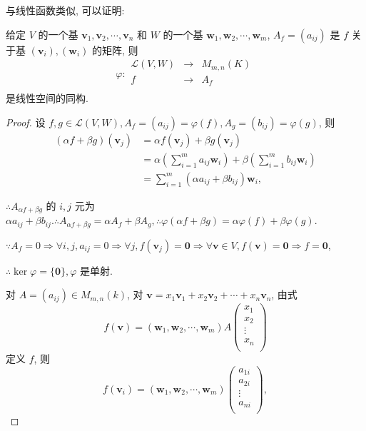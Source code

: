 \documentclass[color=black,device=normal,lang=cn,mode=geye]{elegantnote}
\begin{document}
与线性函数类似, 可以证明:
\begin{theorem}[书上的定理 2(i)]\label{t1.2}
    给定 $V$ 的一个基 $\boldsymbol{v}_1,\boldsymbol{v}_2,\cdots,\boldsymbol{v}_n$ 和 $W$ 的一个基 $\boldsymbol{w}_1,\boldsymbol{w}_2,\cdots,\boldsymbol{w}_m$, $A_f=(a_{ij})$ 是 $f$ 关于基 $(\boldsymbol{v}_i),(\boldsymbol{w}_i)$ 的矩阵, 则
    \[\varphi:\begin{array}{rcl}
        \mathcal{L}(V,W) & \to & M_{m,n}(K) \\
        f & \to & A_f \\
    \end{array}\]
    是线性空间的同构.
\end{theorem}
\begin{proof}
    设 $f,g\in\mathcal{L}(V,W),A_f=(a_{ij})=\varphi(f),A_g=(b_{ij})=\varphi(g)$, 则
    \begin{align*}
        (\alpha f+\beta g)(\boldsymbol{v}_j) & =\alpha f(\boldsymbol{v}_j)+\beta g(\boldsymbol{v}_j) \\
        & =\alpha\left(\sum\limits_{i=1}^ma_{ij}\boldsymbol{w}_i\right)+\beta\left(\sum\limits_{i=1}^mb_{ij}\boldsymbol{w}_i\right) \\
        & =\sum\limits_{i=1}^m(\alpha a_{ij}+\beta b_{ij})\boldsymbol{w}_i,
    \end{align*}
    
    $\therefore A_{\alpha f+\beta g}$ 的 $i,j$ 元为 $\alpha a_{ij}+\beta b_{ij}.\therefore A_{\alpha f+\beta g}=\alpha A_f+\beta A_g,\therefore\varphi(\alpha f+\beta g)=\alpha\varphi(f)+\beta\varphi(g)$.

    $\because A_f=0\Rightarrow\forall i,j,a_{ij}=0\Rightarrow\forall j,f(\boldsymbol{v}_j)=\boldsymbol{0}\Rightarrow\forall\boldsymbol{v}\in V,f(\boldsymbol{v})=\boldsymbol{0}\Rightarrow f=\boldsymbol{0}$,

    $\therefore\ker\varphi=\{\boldsymbol{0}\},\varphi$ 是单射.

    对 $A=(a_{ij})\in M_{m,n}(k)$, 对 $\boldsymbol{v}=x_1\boldsymbol{v}_1+x_2\boldsymbol{v}_2+\cdots+x_n\boldsymbol{v}_n$, 由式
    \[f(\boldsymbol{v})=(\boldsymbol{w}_1,\boldsymbol{w}_2,\cdots,\boldsymbol{w}_m)A\begin{pmatrix}
        x_1 \\
        x_2 \\
        \vdots \\
        x_n \\
    \end{pmatrix}\]
    定义 $f$, 则
    \[f(\boldsymbol{v}_i)=(\boldsymbol{w}_1,\boldsymbol{w}_2,\cdots,\boldsymbol{w}_m)\begin{pmatrix}
        a_{1i} \\
        a_{2i} \\
        \vdots \\
        a_{ni} \\
    \end{pmatrix},\]


\end{proof}
\end{document}
